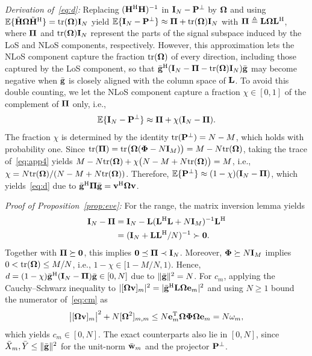 \documentclass[journal]{IEEEtran}
\begin{document}
\textit{Derivation of~\eqref{eq:d}:} Replacing $(\mathbf{H}^{\mathrm H}\mathbf{H})^{-1}$ in $\mathbf{I}_N-\mathbf{P}^{\perp}$ by $\boldsymbol{\Omega}$ and using $\mathbb{E}\{\tilde{\mathbf{H}}\boldsymbol{\Omega}\tilde{\mathbf{H}}^{\mathrm H}\}=\mathrm{tr}(\boldsymbol{\Omega})\mathbf{I}_N$ yield $\mathbb{E}\{\mathbf{I}_N-\mathbf{P}^{\perp}\}\approx\boldsymbol{\Pi}+\mathrm{tr}(\boldsymbol{\Omega})\mathbf{I}_N$ with $\boldsymbol{\Pi}\triangleq\mathbf{L}\boldsymbol{\Omega}\mathbf{L}^{\mathrm H}$, where $\boldsymbol{\Pi}$ and $\mathrm{tr}(\boldsymbol{\Omega})\mathbf{I}_N$ represent the parts of the signal subspace induced by the LoS and NLoS components, respectively. However, this approximation lets the NLoS component capture the fraction $\mathrm{tr}(\boldsymbol{\Omega})$ of every direction, including those captured by the LoS component, so that $\bar{\mathbf{g}}^{\mathrm H}(\mathbf{I}_N-\boldsymbol{\Pi}-\mathrm{tr}(\boldsymbol{\Omega})\mathbf{I}_N)\bar{\mathbf{g}}$ may become negative when $\bar{\mathbf{g}}$ is closely aligned with the column space of $\mathbf{L}$. To avoid this double counting, we let the NLoS component capture a fraction $\chi\in[0,1]$ of the complement of $\boldsymbol{\Pi}$ only, i.e.,
\begin{equation}\label{eq:app4}
\mathbb{E}\{\mathbf{I}_N-\mathbf{P}^{\perp}\}\approx\boldsymbol{\Pi}+\chi(\mathbf{I}_N-\boldsymbol{\Pi}).
\end{equation}
The fraction $\chi$ is determined by the identity $\mathrm{tr}(\mathbf{P}^{\perp})=N-M$, which holds with probability one. Since $\mathrm{tr}(\boldsymbol{\Pi})=\mathrm{tr}\big(\boldsymbol{\Omega}(\boldsymbol{\Phi}-N\mathbf{I}_M)\big)=M-N\mathrm{tr}(\boldsymbol{\Omega})$, taking the trace of~\eqref{eq:app4} yields $M-N\mathrm{tr}(\boldsymbol{\Omega})+\chi\big(N-M+N\mathrm{tr}(\boldsymbol{\Omega})\big)=M$, i.e., $\chi=N\mathrm{tr}(\boldsymbol{\Omega})/(N-M+N\mathrm{tr}(\boldsymbol{\Omega}))$. Therefore, $\mathbb{E}\{\mathbf{P}^{\perp}\}\approx(1-\chi)(\mathbf{I}_N-\boldsymbol{\Pi})$, which yields~\eqref{eq:d} due to $\bar{\mathbf{g}}^{\mathrm H}\boldsymbol{\Pi}\bar{\mathbf{g}}=\mathbf{v}^{\mathrm H}\boldsymbol{\Omega}\mathbf{v}$.

\textit{Proof of Proposition~\ref{prop:eve}:} For the range, the matrix inversion lemma yields
\begin{equation}\label{eq:app5}
\begin{aligned}\mathbf{I}_N-\boldsymbol{\Pi}&=\mathbf{I}_N-\mathbf{L}(\mathbf{L}^{\mathrm H}\mathbf{L}+N\mathbf{I}_M)^{-1}\mathbf{L}^{\mathrm H}\\&=(\mathbf{I}_N+\mathbf{L}\mathbf{L}^{\mathrm H}/N)^{-1}\succ\mathbf 0.\end{aligned}
\end{equation}
Together with $\boldsymbol{\Pi}\succeq\mathbf 0$, this implies $\mathbf 0\preceq\boldsymbol{\Pi}\prec\mathbf{I}_N$. Moreover, $\boldsymbol{\Phi}\succeq N\mathbf{I}_M$ implies $0<\mathrm{tr}(\boldsymbol{\Omega})\le M/N$, i.e., $1-\chi\in[1-M/N,1)$. Hence, $d=(1-\chi)\bar{\mathbf{g}}^{\mathrm H}(\mathbf{I}_N-\boldsymbol{\Pi})\bar{\mathbf{g}}\in[0,N]$ due to $\|\bar{\mathbf{g}}\|^2=N$. For $c_m$, applying the Cauchy--Schwarz inequality to $|[\boldsymbol{\Omega}\mathbf{v}]_m|^2=|\bar{\mathbf{g}}^{\mathrm H}\mathbf{L}\boldsymbol{\Omega}\mathbf{e}_m|^2$ and using $N\ge1$ bound the numerator of~\eqref{eq:cm} as
\begin{equation}\label{eq:app6}
\big|[\boldsymbol{\Omega}\mathbf{v}]_m\big|^2+N[\boldsymbol{\Omega}^2]_{m,m}\le N\mathbf{e}_m^{\mathrm T}\boldsymbol{\Omega}\boldsymbol{\Phi}\boldsymbol{\Omega}\mathbf{e}_m=N\omega_m,
\end{equation}
which yields $c_m\in[0,N]$. The exact counterparts also lie in $[0,N]$, since $\bar X_m,\bar Y\le\|\bar{\mathbf{g}}\|^2$ for the unit-norm $\bar{\mathbf{w}}_m$ and the projector $\mathbf{P}^{\perp}$.
\end{document}
